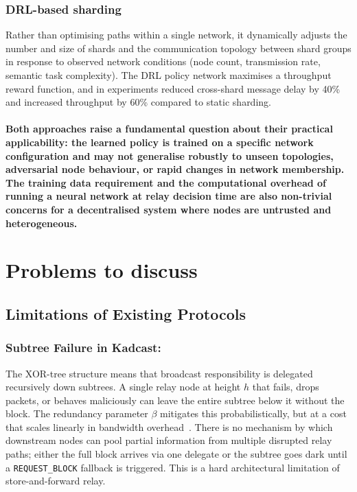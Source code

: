 \documentclass{article}
\begin{document}
\subsubsection*{DRL-based sharding}
Rather than optimising paths within a single network, it dynamically adjusts the number and size of shards and  the communication topology between shard groups in response to observed network conditions (node count, transmission rate, semantic task complexity). The DRL policy network maximises a throughput reward function, and in experiments reduced cross-shard message delay by 40\% and increased throughput by 60\% compared to static sharding.~\cite{linUnifiedBlockchainSemanticFramework2022}
 \paragraph{Both approaches raise a fundamental question about their practical applicability: the learned policy is trained on a specific network configuration and may not generalise robustly to unseen topologies, adversarial node behaviour, or rapid changes in network membership. The training data requirement and the computational overhead of running a neural network at relay decision time are also non-trivial concerns for a decentralised system where nodes are untrusted and heterogeneous.}



\section{Problems to discuss}
\subsection{Limitations of Existing Protocols}
\subsubsection*{Subtree Failure in Kadcast:} The XOR-tree structure means that broadcast responsibility is delegated recursively down subtrees. A single relay node at height $h$ that fails, drops packets, or behaves maliciously can leave the entire subtree below it without the block. The redundancy parameter $\beta$ mitigates this probabilistically, but at a cost that scales linearly in bandwidth overhead~\cite{rohrerKadcastStructuredApproach2019}. There is no mechanism by which downstream nodes can pool partial information from multiple disrupted relay paths; either the full block arrives via one delegate or the subtree goes dark until a \texttt{REQUEST\_BLOCK} fallback is triggered. This is a hard architectural limitation of store-and-forward relay.
\end{document}
